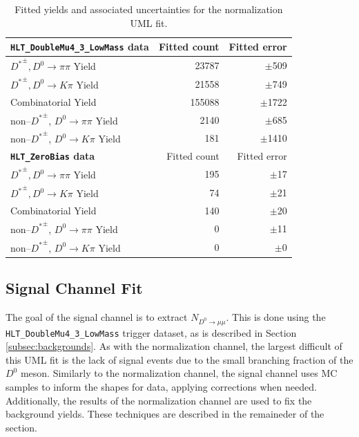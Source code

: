 \begin{table}[h!]
    \centering
    \begin{tabular}{@{}lrr@{}}
    \toprule
    \toprule
    \textbf{\texttt{HLT\_DoubleMu4\_3\_LowMass} data}& Fitted count & Fitted error  \\
    \midrule
    ${D^*}^\pm, D^0 \to \pi\pi$ Yield        & 23787 & $\pm$509 \\
    ${D^*}^\pm, D^0 \to K\pi$ Yield          & 21558  & $\pm$749 \\
    Combinatorial Yield               & 155088 & $\pm$1722 \\
    non--${D^*}^\pm$, $D^0 \to \pi\pi$ Yield & 2140   & $\pm$685 \\
    non--${D^*}^\pm$, $D^0 \to K\pi$ Yield   & 181     & $\pm$1410 \\
    \bottomrule
    \toprule
    \textbf{\texttt{HLT\_ZeroBias} data} & Fitted count & Fitted error \\
    \midrule
    ${D^*}^\pm, D^0 \to \pi\pi$ Yield        & 195 & $\pm$17 \\
    ${D^*}^\pm, D^0 \to K\pi$ Yield          & 74  & $\pm$21 \\
    Combinatorial Yield               & 140 & $\pm$20 \\
    non--${D^*}^\pm$, $D^0 \to \pi\pi$ Yield & 0   & $\pm$11 \\
    non--${D^*}^\pm$, $D^0 \to K\pi$ Yield   & 0     & $\pm$0 \\
    \bottomrule
    \bottomrule
    \end{tabular}
    \caption{Fitted yields and associated uncertainties for the normalization UML fit.}
    \label{tab:d0pipi_uml_fit_results}
    \end{table}

\subsection{Signal Channel Fit}
\label{subsec:signal_channel_uml}

The goal of the signal channel is to extract $N_{D^0 \to \mu \mu}$. This is done using the \linebreak[4]\texttt{HLT\_DoubleMu4\_3\_LowMass}
trigger dataset, as is described in Section \ref{subsec:backgrounds}. As with the normalization channel, the largest difficult of this UML fit is the lack of signal events due to the small branching fraction of the $D^0$ meson. Similarly to the normalization channel, the signal channel uses MC samples to inform the shapes for data, applying corrections when needed. Additionally, the results of the normalization channel are used to fix the background yields. These techniques are described in the remaineder of the section.

